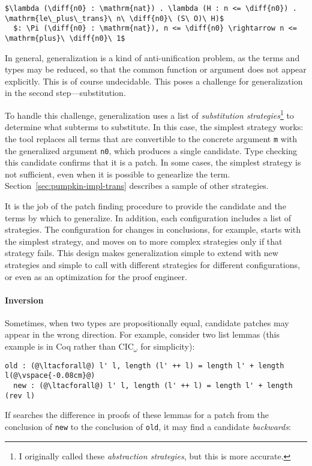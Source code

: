 \begin{lstlisting}[language=coq]
  $\lambda (\diff{n0} : \mathrm{nat}) . \lambda (H : n <= \diff{n0}) . \mathrm{le\_plus\_trans}\ n\ \diff{n0}\ (S\ O)\ H)$
  $: \Pi (\diff{n0} : \mathrm{nat}), n <= \diff{n0} \rightarrow n <= \mathrm{plus}\ \diff{n0}\ 1$
\end{lstlisting}

In general, generalization is a kind of anti-unification problem, %
as the terms and types may be reduced,
so that the common function or argument does not appear explicitly.
This is of course undecidable.
This poses a challenge for generalization in the second step---substitution.

To handle this challenge, generalization uses a list of \textit{substitution strategies}\footnote{I originally called these \textit{abstraction strategies}, but this is more accurate.}
to determine what subterms to substitute.
In this case, the simplest strategy works: the tool
replaces all terms that are convertible to the concrete argument \lstinline{m} with the generalized argument
\lstinline{n0}, which produces a single candidate. Type checking this candidate confirms that it is a patch.
In some cases, the simplest strategy is not sufficient, even when it is possible to genearlize the term.
Section~\ref{sec:pumpkin-impl-trans} describes a sample of other strategies.

It is the job of the patch finding procedure to provide the candidate and the terms by which to generalize.
In addition, each configuration includes a list of strategies.
The configuration for changes in conclusions, for example, starts with the simplest strategy,
and moves on to more complex strategies only if that strategy fails.
This design makes generalization simple to extend with new strategies and simple to call with different strategies
for different configurations, or even as an optimization for the proof engineer.

\paragraph{Inversion} Sometimes, when two types are propositionally equal, %
candidate patches may appear in the wrong direction.
For example, consider two list lemmas (this example is in Coq rather than CIC$_{\omega}$ for simplicity): %

\begin{lstlisting}[language=coq]
  old : (@\ltacforall@) l' l, length (l' ++ l) = length l' + length l(@\vspace{-0.08cm}@)
  new : (@\ltacforall@) l' l, length (l' ++ l) = length l' + length (rev l)
\end{lstlisting} 
If \sysname searches the difference in proofs of these lemmas for a patch from the 
conclusion of \lstinline{new} to the conclusion of \lstinline{old},
it may find a candidate \emph{backwards}:

